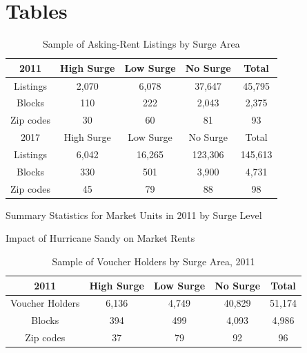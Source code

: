 \documentclass[12pt]{article}
\begin{document}
{{{{{{\clearpage
\section{Tables} 

\begin{table}[!htbp]
\begin{center}
\caption{\label{tab:marketsamp}Sample of Asking-Rent Listings by Surge Area}
\begin{tabular}{||c c c c c||} 
 \toprule
   2011 & High Surge & Low Surge & No Surge & Total \\ [0.5ex] 
\midrule
Listings & 2,070 & 6,078 & 37,647 & 45,795 \\
\hline
 Blocks & 110 & 222 & 2,043 & 2,375 \\  
 \hline
 Zip codes & 30  & 60 & 81 & 93 \\
 \midrule 
    2017 & High Surge & Low Surge & No Surge & Total \\ [0.5ex] 
\midrule
Listings & 6,042 & 16,265 & 123,306 & 145,613 \\
\hline
 Blocks & 330 & 501 & 3,900 & 4,731 \\  
 \hline
 Zip codes & 45  & 79 & 88 & 98 \\
\bottomrule
\end{tabular}
\end{center}
\end{table}



\begin{table}[!htbp]
\centering
\caption{\label{tab:marketstats}Summary Statistics for Market Units in 2011 by Surge Level}

\end{table}



\begin{table}[!htbp]
\centering
\caption{\label{tab:marketrents}Impact of Hurricane Sandy on Market Rents}

\end{table}

\newpage
\begin{table}[!htbp]
\begin{center}
\caption{\label{tab:vouchsamp}Sample of Voucher Holders by Surge Area, 2011}
\begin{tabular}{||c c c c c||} 
 \toprule
   2011 & High Surge & Low Surge & No Surge & Total \\ [0.5ex] 
\midrule
 Voucher Holders & 6,136 & 4,749 & 40,829 & 51,174 \\
  \hline
 Blocks & 394 & 499 & 4,093 & 4,986 \\ 
 \hline
 Zip codes & 37 & 79 & 92 & 96 \\
 \hline
\end{tabular}
\end{center}
\end{table}

}}}}}}
\end{document}

